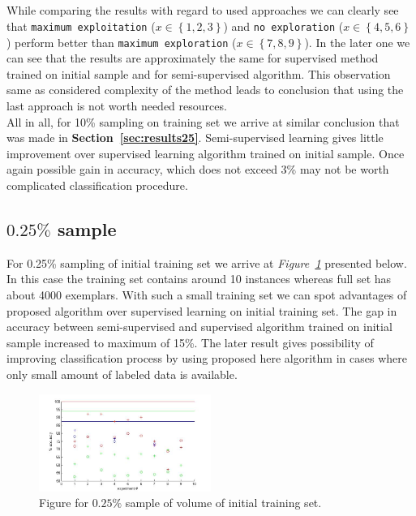 \documentclass[12pt, a4paper, pdflatex]{report}
\begin{document}
\subsection*{}
While comparing the results with regard to used approaches we can clearly see that \texttt{maximum exploitation} ($x \in \left \{ 1, 2, 3 \right \}$) and \texttt{no exploration} ($x \in \left \{ 4, 5, 6 \right \}$) perform better than \texttt{maximum exploration} ($x \in \left \{ 7, 8, 9 \right \}$). In the later one we can see that the results are approximately the same for supervised method trained on initial sample and for semi-supervised algorithm. This observation same as considered complexity of the method leads to conclusion that using the last approach is not worth needed resources.\\

All in all, for 10\% sampling on training set we arrive at similar conclusion that was made in \textbf{Section~\ref{sec:results25}}. Semi-supervised learning gives little improvement over supervised learning algorithm trained on initial sample. Once again possible gain in accuracy, which does not exceed 3\% may not be worth complicated classification procedure.


\subsection{$\mathbf{0.25\%}$ sample~\cite{results025}\label{sec:results025}}
For 0.25\% sampling of initial training set we arrive at \emph{Figure~\ref{img:025pc}} presented below. In this case the training set contains around 10 instances whereas full set has about 4000 exemplars. With such a small training set we can spot advantages of proposed algorithm over supervised learning on initial training set. The gap in accuracy between semi-supervised and supervised algorithm trained on initial sample increased to maximum of 15\%. The later result gives possibility of improving classification process by using proposed here algorithm in cases where only small amount of labeled data is available.

\begin{figure}[htbp]
\centering
  \includegraphics[width=0.5\textwidth]{graphics/figures/Pfig3.jpg}
\begin{tiny}
\caption{\small Figure for $0.25\%$ sample of volume of initial training set.\label{img:025pc}}
\end{tiny}
\end{figure}
\end{document}

